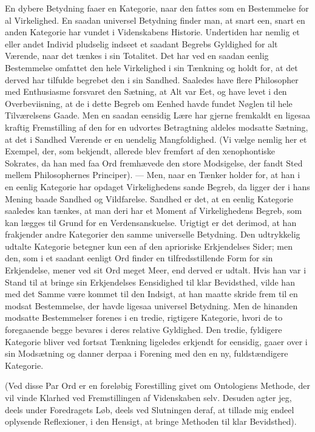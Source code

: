 \documentclass[12pt]{article}
\newcommand{\opage}[1]{\marginnote{\footnotesize\textit{[#1]}}}
\begin{document}
En dybere Betydning faaer en Kategorie, naar den fattes som en Bestemmelse for al
Virkelighed. En saadan universel Betydning finder man, at snart een, snart en
anden Kategorie har vundet i Videnskabens Historie. Undertiden har nemlig et
eller andet Individ pludselig indseet et saadant Begrebs Gyldighed for alt
Værende, naar det tænkes i sin Totalitet. Det har ved en saadan eenlig
Bestemmelse omfattet den hele Virkelighed i sin Tænkning og holdt for, at det
derved har tilfulde begrebet den i sin Sandhed. Saaledes have flere Philosopher
med Enthusiasme forsvaret den Sætning, at Alt var Eet, og have levet i den
Overbeviisning, at de i dette Begreb om Eenhed havde fundet Nøglen til hele
Tilværelsens Gaade. Men en saadan \opage{200}eensidig Lære har gjerne fremkaldt
en ligesaa kraftig Fremstilling af den for en udvortes Betragtning aldeles
modsatte Sætning, at det i Sandhed Værende er en uendelig Mangfoldighed. (Vi
vælge nemlig her et Exempel, der, som bekjendt, allerede blev fremført af den
xenophontiske Sokrates, da han med faa Ord fremhævede den store Modsigelse, der
fandt Sted mellem Philosophernes Principer). --- Men, naar en Tænker holder for,
at han i en eenlig Kategorie har opdaget Virkelighedens sande Begreb, da ligger
der i hans Mening baade Sandhed og Vildfarelse. Sandhed er det, at en eenlig
Kategorie saaledes kan tænkes, at man deri har et Moment af Virkelighedens
Begreb, som kan lægges til Grund for en Verdensanskuelse. Urigtigt er det
derimod, at han frakjender andre Kategorier den samme universelle Betydning. Den
udtrykkelig udtalte Kategorie betegner kun een af den aprioriske Erkjendelses
Sider; men den, som i et saadant eenligt Ord finder en tilfredsstillende Form
for sin Erkjendelse, mener ved sit Ord meget Meer, end derved er udtalt. Hvis
han var i Stand til at bringe sin Erkjendelses Eensidighed til klar Bevidsthed,
vilde han med det Samme være kommet til den Indsigt, at han maatte skride frem
til en modsat Bestemmelse, der havde ligesaa universel Betydning. Men de
hinanden modsatte Bestemmelser forenes i en tredie, rigtigere Kategorie, hvori
de to foregaaende begge bevares i deres relative Gyldighed. Den tredie, fyldigere
Kategorie bliver ved fortsat Tænkning ligeledes erkjendt for eensidig, gaaer
over i sin Modsætning og danner derpaa i Forening med den en ny, fuldstændigere
Kategorie.

(Ved disse Par Ord er en foreløbig Forestilling givet om Ontologiens Methode,
der vil vinde Klarhed ved Fremstillingen af Videnskaben selv. Desuden agter jeg,
deels under Foredragets Løb, deels ved Slutningen deraf, at tillade mig endeel
oplysende Reflexioner, i den Hensigt, at bringe Methoden til klar Bevidsthed).
\end{document}
